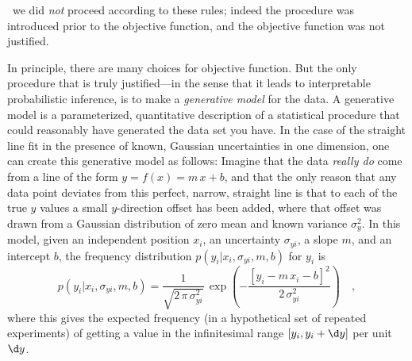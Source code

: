 \documentclass[12pt,twoside,pdftex]{article}
\begin{document}
\sectionname\ we did \emph{not} proceed according to these rules;
indeed the procedure was introduced prior to the objective function,
and the objective function was not justified.

In principle, there are many choices for objective function.  But the
only procedure that is truly justified---in the sense that it leads to
interpretable probabilistic inference, is to make a \emph{generative
  model} for the data.  A generative model is a parameterized,
quantitative description of a statistical procedure that could
reasonably have generated the data set you have.  In the case of the
straight line fit in the presence of known, Gaussian uncertainties in
one dimension, one can create this generative model as follows:
Imagine that the data \emph{really do} come from a line of the form $y
= f(x) = m\,x+b$, and that the only reason that any data point
deviates from this perfect, narrow, straight line is that to each of
the true $y$ values a small $y$-direction offset has been added, where
that offset was drawn from a Gaussian distribution of zero mean and
known variance $\sigma_y^2$.  In this model, given an independent
position $x_i$, an uncertainty $\sigma_{yi}$, a slope $m$, and an
intercept $b$, the frequency distribution $p(y_i|x_i,\sigma_{yi},m,b)$
for $y_i$ is
\begin{equation}\label{eq:objectivei}
p(y_i|x_i,\sigma_{yi},m,b) = \frac{1}{\sqrt{2\,\pi\,\sigma_{yi}^2}}
 \,\exp\left(-\frac{[y_i - m\,x_i - b]^2}{2\,\sigma_{yi}^2}\right) \quad ,
\end{equation}
where this gives the expected frequency (in a hypothetical set of
repeated experiments) of getting a value in the infinitesimal
range $[y_i,y_i+\d y]$ per unit $\d y$.
\end{document}
